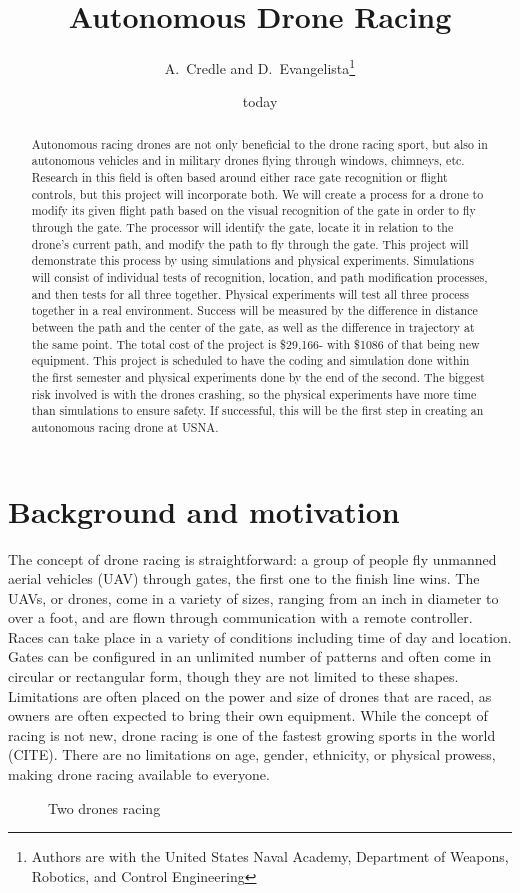 \documentclass[onecolumn,10pt]{IEEEtran}
\title{Autonomous Drone Racing}
\author{A.~Credle and D.~Evangelista\thanks{Authors are with the United States Naval Academy, Department of Weapons, Robotics, and Control Engineering}}
\date{today}
\begin{document}
\maketitle

\begin{abstract}
Autonomous racing drones are not only beneficial to the drone racing sport, but also in autonomous vehicles and in military drones flying through windows, chimneys, etc. Research in this field is often based around either race gate recognition or flight controls, but this project will incorporate both. We will create a process for a drone to modify its given flight path based on the visual recognition of the gate in order to fly through the gate. The processor will identify the gate, locate it in relation to the drone’s current path, and modify the path to fly through the gate. This project will demonstrate this process by using simulations and physical experiments. Simulations will consist of individual tests of recognition, location, and path modification processes, and then tests for all three together. Physical experiments will test all three process together in a real environment. Success will be measured by the difference in distance between the path and the center of the gate, as well as the difference in trajectory at the same point. The total cost of the project is \$29,166- with \$1086 of that being new equipment. This project is scheduled to have the coding and simulation done within the first semester and physical experiments done by the end of the second. The biggest risk involved is with the drones crashing, so the physical experiments have more time than simulations to ensure safety. If successful, this will be the first step in creating an autonomous racing drone at USNA.
\end{abstract}

\section{Background and motivation}
The concept of drone racing is straightforward: a group of people fly unmanned aerial vehicles (UAV) through gates, the first one to the finish line wins. The UAVs, or drones, come in a variety of sizes, ranging from an inch in diameter to over a foot, and are flown through communication with a remote controller. Races can take place in a variety of conditions including time of day and location. Gates can be configured in an unlimited number of patterns and often come in circular or rectangular form, though they are not limited to these shapes. Limitations are often placed on the power and size of drones that are raced, as owners are often expected to bring their own equipment. While the concept of racing is not new, drone racing is one of the fastest growing sports in the world (CITE). There are no limitations on age, gender, ethnicity, or physical prowess, making drone racing available to everyone.
\begin{figure}
\caption{Two drones racing}
\label{fig1}
\end{figure}
\end{document}
